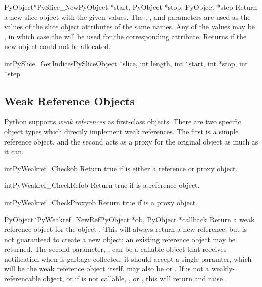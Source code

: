 \begin{cfuncdesc}{PyObject*}{PySlice_New}{PyObject *start, PyObject *stop,
                                          PyObject *step}
  Return a new slice object with the given values.  The ,
  , and  parameters are used as the values of the
  slice object attributes of the same names.  Any of the values may be
  \NULL, in which case the  will be used for the
  corresponding attribute.  Returns \NULL{} if the new object could
  not be allocated.
\end{cfuncdesc}

\begin{cfuncdesc}{int}{PySlice_GetIndices}{PySliceObject *slice, int length,
                                           int *start, int *stop, int *step}
\end{cfuncdesc}


\subsection{Weak Reference Objects \label{weakref-objects}}

Python supports \emph{weak references} as first-class objects.  There
are two specific object types which directly implement weak
references.  The first is a simple reference object, and the second
acts as a proxy for the original object as much as it can.

\begin{cfuncdesc}{int}{PyWeakref_Check}{ob}
  Return true if  is either a reference or proxy object.
\end{cfuncdesc}

\begin{cfuncdesc}{int}{PyWeakref_CheckRef}{ob}
  Return true if  is a reference object.
\end{cfuncdesc}

\begin{cfuncdesc}{int}{PyWeakref_CheckProxy}{ob}
  Return true if  is a proxy object.
\end{cfuncdesc}

\begin{cfuncdesc}{PyObject*}{PyWeakref_NewRef}{PyObject *ob,
                                               PyObject *callback}
  Return a weak reference object for the object .  This will
  always return a new reference, but is not guaranteed to create a new
  object; an existing reference object may be returned.  The second
  parameter, , can be a callable object that receives
  notification when  is garbage collected; it should accept a
  single paramter, which will be the weak reference object itself.
   may also be  or \NULL.  If 
  is not a weakly-referencable object, or if  is not
  callable, , or \NULL, this will return \NULL{} and
  raise .
\end{cfuncdesc}

